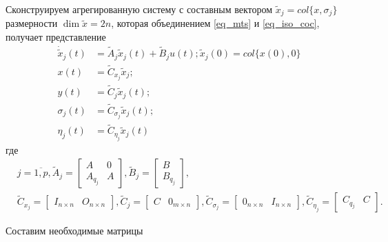 Сконструируем агрегированную систему с составным вектором $\tilde{x}_j = col\{x, \sigma_j\}$ размерности $ \dim \tilde{x} = 2n$, которая объединением \ref{eq_mts} и \ref{eq_iso_coc}, получает представление
\begin{align}\label{rang_system}
	\dot{\tilde{x}}_j (t) &= \tilde{A}_j \tilde{x}_j (t) + \tilde{B}_j u(t); 
	\tilde{x}_j (0) = col \{x(0), 0\}\\
	x(t) &= \tilde{C}_{x_j} \tilde{x}_j;\\
	y(t) &= \tilde{C}_j \tilde{x}_j (t);\\
	\sigma_j (t) &= \tilde{C}_{\sigma_j} \tilde{x}_j (t);\\
	\eta_j (t) &= \tilde{C}_{\eta_j} \tilde{x}_j (t)
\end{align}
где 
\begin{align*}
	&j = \overline{1, p},
	\tilde{A}_j =
	\begin{bmatrix}
	A & 0\\
	A_{q_j} & A
	\end{bmatrix},
	\tilde{B}_j = 
	\begin{bmatrix}
		B\\
		B_{q_j}
	\end{bmatrix},\\
	&\tilde{C}_{x_j} = 
	\begin{bmatrix}
		I_{n \times n} & O_{n \times n}
	\end{bmatrix},
	\tilde{C}_{j} = 
	\begin{bmatrix}
		C & 0_{m \times n}
	\end{bmatrix},
	\tilde{C}_{\sigma_{j}} = 
	\begin{bmatrix}
		0_{n \times n} & I_{n \times n}
	\end{bmatrix},
	\tilde{C}_{\eta_{j}} = 
	\begin{bmatrix}
		C_{q_j} & C
	\end{bmatrix}.	
\end{align*}

Составим необходимые матрицы

